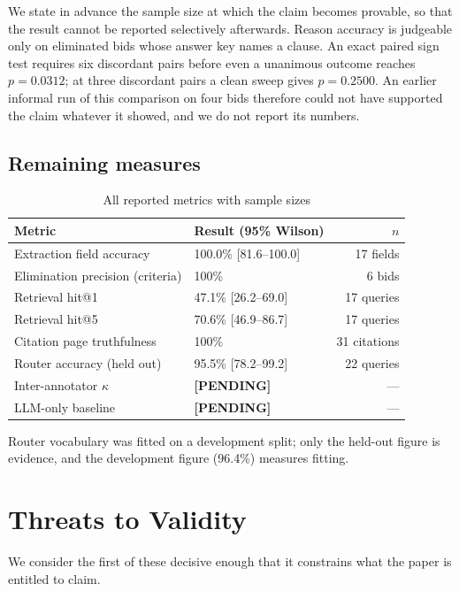\documentclass[conference]{IEEEtran}
\begin{document}
We state in advance the sample size at which the claim becomes provable, so that
the result cannot be reported selectively afterwards. Reason accuracy is
judgeable only on eliminated bids whose answer key names a clause. An exact
paired sign test requires six discordant pairs before even a unanimous outcome
reaches $p=0.0312$; at three discordant pairs a clean sweep gives $p=0.2500$.
An earlier informal run of this comparison on four bids therefore could not have
supported the claim whatever it showed, and we do not report its numbers.

\subsection{Remaining measures}

\begin{table}[htbp]
\caption{All reported metrics with sample sizes}
\label{tab:all}
\centering
\begin{tabular}{@{}llr@{}}
\toprule
Metric & Result (95\% Wilson) & $n$ \\
\midrule
Extraction field accuracy & 100.0\% [81.6--100.0] & 17 fields \\
Elimination precision (criteria) & 100\% & 6 bids \\
Retrieval hit@1 & 47.1\% [26.2--69.0] & 17 queries \\
Retrieval hit@5 & 70.6\% [46.9--86.7] & 17 queries \\
Citation page truthfulness & 100\% & 31 citations \\
Router accuracy (held out) & 95.5\% [78.2--99.2] & 22 queries \\
Inter-annotator $\kappa$ & \textbf{[PENDING]} & --- \\
LLM-only baseline & \textbf{[PENDING]} & --- \\
\bottomrule
\end{tabular}
\end{table}

Router vocabulary was fitted on a development split; only the held-out figure is
evidence, and the development figure (96.4\%) measures fitting.

\section{Threats to Validity}
\label{sec:threats}

We consider the first of these decisive enough that it constrains what the paper
is entitled to claim.
\end{document}
